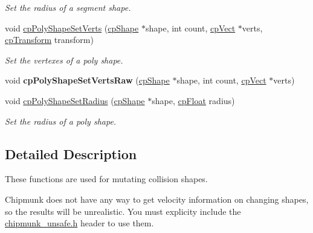 \begin{DoxyCompactItemize}
\begin{DoxyCompactList}\small\item\em Set the radius of a segment shape. \end{DoxyCompactList}\item 
\hypertarget{group__unsafe_ga01f146c4075300266d092265214e8f73}{}void \hyperlink{group__unsafe_ga01f146c4075300266d092265214e8f73}{cp\+Poly\+Shape\+Set\+Verts} (\hyperlink{structcp_shape}{cp\+Shape} $\ast$shape, int count, \hyperlink{structcp_vect}{cp\+Vect} $\ast$verts, \hyperlink{structcp_transform}{cp\+Transform} transform)\label{group__unsafe_ga01f146c4075300266d092265214e8f73}

\begin{DoxyCompactList}\small\item\em Set the vertexes of a poly shape. \end{DoxyCompactList}\item 
\hypertarget{group__unsafe_ga52eef468081fabdad632566dbe7285cb}{}void {\bfseries cp\+Poly\+Shape\+Set\+Verts\+Raw} (\hyperlink{structcp_shape}{cp\+Shape} $\ast$shape, int count, \hyperlink{structcp_vect}{cp\+Vect} $\ast$verts)\label{group__unsafe_ga52eef468081fabdad632566dbe7285cb}

\item 
\hypertarget{group__unsafe_gac07935293e822ff3f57540cbc9a23f1c}{}void \hyperlink{group__unsafe_gac07935293e822ff3f57540cbc9a23f1c}{cp\+Poly\+Shape\+Set\+Radius} (\hyperlink{structcp_shape}{cp\+Shape} $\ast$shape, \hyperlink{group__basic_types_gac1ed65573e035bf892505768c852d8d3}{cp\+Float} radius)\label{group__unsafe_gac07935293e822ff3f57540cbc9a23f1c}

\begin{DoxyCompactList}\small\item\em Set the radius of a poly shape. \end{DoxyCompactList}\end{DoxyCompactItemize}


\subsection{Detailed Description}
These functions are used for mutating collision shapes. 

Chipmunk does not have any way to get velocity information on changing shapes, so the results will be unrealistic. You must explicity include the \hyperlink{chipmunk__unsafe_8h_source}{chipmunk\+\_\+unsafe.\+h} header to use them. 